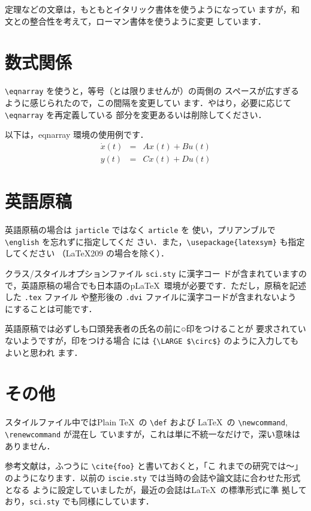 \documentclass[a4paper]{article}
\begin{document}
定理などの文章は，もともとイタリック書体を使うようになってい
ますが，和文との整合性を考えて，ローマン書体を使うように変更
しています．

\section{数式関係}
\verb+\eqnarray+ を使うと，等号（とは限りませんが）の両側の
スペースが広すぎるように感じられたので，この間隔を変更してい
ます．やはり，必要に応じて \verb+\eqnarray+ を再定義している
部分を変更あるいは削除してください．

以下は，eqnarray 環境の使用例です．
\begin{eqnarray}
 \dot{x}(t) & = & A x(t) + B u(t) \\
 y(t) & = & C x(t) + D u(t)
\end{eqnarray}

\section{英語原稿}

英語原稿の場合は \verb+jarticle+ ではなく \verb+article+ を
使い，プリアンブルで \verb+\english+ を忘れずに指定してくだ
さい．また，\verb+\usepackage{latexsym}+ も指定してください
（\LaTeX 209 の場合を除く）．

クラス/スタイルオプションファイル \verb+sci.sty+ に漢字コー
ドが含まれていますので，英語原稿の場合でも日本語のp\LaTeX\ 
環境が必要です．ただし，原稿を記述した \verb+.tex+ ファイル
や整形後の \verb+.dvi+ ファイルに漢字コードが含まれないよう
にすることは可能です．

英語原稿では必ずしも口頭発表者の氏名の前に○印をつけることが
要求されていないようですが，印をつける場合
には \verb+{\LARGE $\circ$}+ のように入力してもよいと思われ
ます．

\section{その他}

スタイルファイル中ではPlain \TeX\ の \verb+\def+ および 
\LaTeX\ の \verb+\newcommand+, \verb+\renewcommand+ が混在し
ていますが，これは単に不統一なだけで，深い意味はありません．

参考文献は，ふつうに \verb+\cite{foo}+ と書いておくと，「こ
れまでの研究\cite{foo}では～」のようになります．以前の 
\verb+iscie.sty+ では当時の会誌や論文誌に合わせた形式となる
ように設定していましたが，最近の会誌は\LaTeX\ の標準形式に準
拠しており，\verb+sci.sty+ でも同様にしています．
\end{document}
